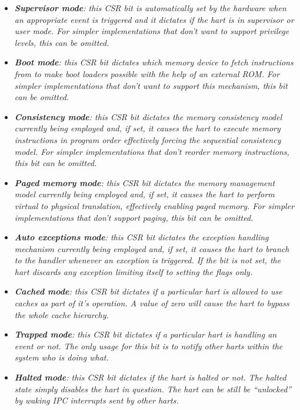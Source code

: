             \begin{itemize}

                \item \textit{\textbf{Supervisor mode}: this CSR bit is automatically set by the hardware when an appropriate event is triggered and it dictates if the hart is in supervisor or user mode. For simpler implementations that don't want to support privilege levels, this can be omitted.}

                \item \textit{\textbf{Boot mode}: this CSR bit dictates which memory device to fetch instructions from to make boot loaders possible with the help of an external ROM. For simpler implementations that don't want to support this mechanism, this bit can be omitted.}

                \item \textit{\textbf{Consistency mode}: this CSR bit dictates the memory consistency model currently being employed and, if set, it causes the hart to execute memory instructions in program order effectively forcing the sequential consistency model. For simpler implementations that don't reorder memory instructions, this bit can be omitted.}

                \item \textit{\textbf{Paged memory mode}: this CSR bit dictates the memory management model currently being employed and, if set, it causes the hart to perform virtual to physical translation, effectively enabling paged memory. For simpler implementations that don't support paging, this bit can be omitted.}

                \item \textit{\textbf{Auto exceptions mode}: this CSR bit dictates the exception handling mechanism currently being employed and, if set, it causes the hart to branch to the handler whenever an exception is triggered. If the bit is not set, the hart discards any exception limiting itself to setting the flags only.}

                \item \textit{\textbf{Cached mode}: this CSR bit dictates if a particular hart is allowed to use caches as part of it's operation. A value of zero will cause the hart to bypass the whole cache hierarchy.}

                \item \textit{\textbf{Trapped mode}: this CSR bit dictates if a particular hart is handling an event or not. The only usage for this bit is to notify other harts within the system who is doing what.}

                \item \textit{\textbf{Halted mode}: this CSR bit dictates if the hart is halted or not. The halted state simply disables the hart in question. The hart can be still be ``unlocked'' by waking IPC interrupts sent by other harts.}

            \end{itemize}

